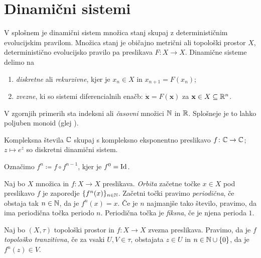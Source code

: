 \section{Dinamični sistemi} \label{sec:dis}

V splošnem je dinamični sistem množica stanj skupaj z determinističnim evolucijskim pravilom. Množica stanj je običajno metrični ali topološki prostor \(X\), deterministično evolucijsko pravilo pa preslikava \(F \colon X \to X\). Dinamične sisteme delimo na

\begin{enumerate}
    \item \emph{diskretne} ali \emph{rekurzivne}, kjer je \(x_n \in X\) in \(x_{n + 1} = F (x_n)\);
    \item \emph{zvezne}, ki so sistemi diferencialnih enačb: \(\dot{\mathbf{x}} = F (\mathbf{x})\) za \(\mathbf{x} \in X \subseteq \mathbb R^n\).
\end{enumerate}

\noindent V zgornjih primerih sta indeksni ali \emph{časovni} množici \(\mathbb N\) in \(\mathbb R\). Splošneje je to lahko poljuben monoid (glej \cite{Giunti_2012}).

\begin{zgled}
    Kompleksna števila \(\mathbb C\) skupaj s kompleksno eksponentno preslikavo \(f \colon \mathbb C \to \mathbb C\); \(z \mapsto e^{z}\) so diskretni dinamični sistem.
\end{zgled}

\noindent Označimo \(f^n \coloneq f \circ f^{n - 1}\), kjer je \(f^0 = \operatorname{Id}\).

\begin{definicija}
    Naj bo \(X\) množica in \(f \colon X \to X\) preslikava. \emph{Orbita} začetne točke \(x \in X\) pod preslikavo \(f\) je zaporedje \(\{f^n (x)\}_{n \in \mathbb N}\). Začetni točki pravimo \emph{periodična}, če obstaja tak \(n \in \mathbb N\), da je \(f^n (x) = x\). Če je \(n\) najmanjše tako število, pravimo, da ima periodična točka periodo \(n\). Periodična točka je \emph{fiksna}, če je njena perioda \(\num{1}\).
\end{definicija}

\begin{definicija}
    Naj bo \((X, \tau)\) topološki prostor in \(f \colon X \to X\) zvezna preslikava. Pravimo, da je \(f\) \emph{topološko tranzitivna}, če za vsaki \(U, V \in \tau\), obstajata \(z \in U\) in \(n \in \mathbb N \cup \left\{ 0 \right\}\), da je \(f^n (z) \in V\).
\end{definicija}

